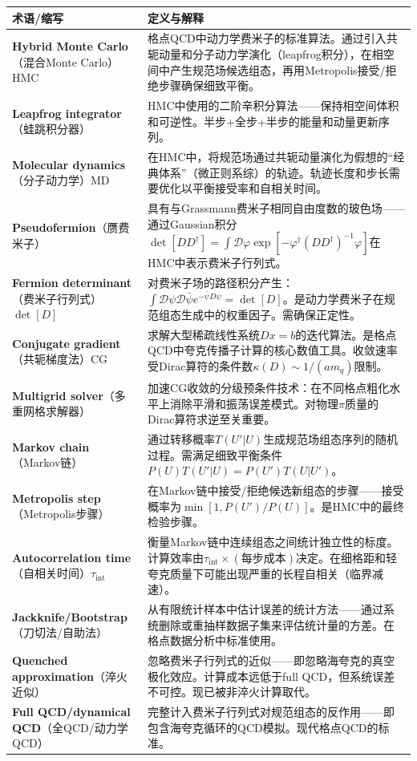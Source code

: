 \documentclass[12pt,a4paper]{ctexart}
\begin{document}
\begin{longtable}{p{3.5cm}p{9cm}}
\toprule
\textbf{术语/缩写} & \textbf{定义与解释} \\
\midrule
\endhead
\textbf{Hybrid Monte Carlo}（混合Monte Carlo）HMC& 格点QCD中动力学费米子的标准算法。通过引入共轭动量和分子动力学演化（leapfrog积分），在相空间中产生规范场候选组态，再用Metropolis接受/拒绝步骤确保细致平衡。\\
\textbf{Leapfrog integrator}（蛙跳积分器）& HMC中使用的二阶辛积分算法——保持相空间体积和可逆性。半步+全步+半步的能量和动量更新序列。\\
\textbf{Molecular dynamics}（分子动力学）MD& 在HMC中，将规范场通过共轭动量演化为假想的``经典体系''（微正则系综）的轨迹。轨迹长度和步长需要优化以平衡接受率和自相关时间。\\
\textbf{Pseudofermion}（赝费米子）& 具有与Grassmann费米子相同自由度数的玻色场——通过Gaussian积分$\det[D D^\dagger] = \int \mathcal{D}\varphi \exp[-\varphi^\dagger (D D^\dagger)^{-1}\varphi]$在HMC中表示费米子行列式。\\
\textbf{Fermion determinant}（费米子行列式）$\det[D]$& 对费米子场的路径积分产生：$\int\mathcal{D}\psi\mathcal{D}\bar\psi e^{-\bar\psi D \psi} = \det[D]$。是动力学费米子在规范组态生成中的权重因子。需确保正定性。\\
\textbf{Conjugate gradient}（共轭梯度法）CG& 求解大型稀疏线性系统$D x = b$的迭代算法。是格点QCD中夸克传播子计算的核心数值工具。收敛速率受Dirac算符的条件数$\kappa(D) \sim 1/(a m_q)$限制。\\
\textbf{Multigrid solver}（多重网格求解器）& 加速CG收敛的分级预条件技术：在不同格点粗化水平上消除平滑和振荡误差模式。对物理$\pi$质量的Dirac算符求逆至关重要。\\
\textbf{Markov chain}（Markov链）& 通过转移概率$T(U'|U)$生成规范场组态序列的随机过程。需满足细致平衡条件$P(U)T(U'|U) = P(U')T(U|U')$。\\
\textbf{Metropolis step}（Metropolis步骤）& 在Markov链中接受/拒绝候选新组态的步骤——接受概率为$\min[1, P(U')/P(U)]$。是HMC中的最终检验步骤。\\
\textbf{Autocorrelation time}（自相关时间）$\tau_{\text{int}}$& 衡量Markov链中连续组态之间统计独立性的标度。计算效率由$\tau_{\text{int}} \times (\text{每步成本})$决定。在细格距和轻夸克质量下可能出现严重的长程自相关（临界减速）。\\
\textbf{Jackknife/Bootstrap}（刀切法/自助法）& 从有限统计样本中估计误差的统计方法——通过系统删除或重抽样数据子集来评估统计量的方差。在格点数据分析中标准使用。\\
\textbf{Quenched approximation}（淬火近似）& 忽略费米子行列式的近似——即忽略海夸克的真空极化效应。计算成本远低于full QCD，但系统误差不可控。现已被非淬火计算取代。\\
\textbf{Full QCD/dynamical QCD}（全QCD/动力学QCD）& 完整计入费米子行列式对规范组态的反作用——即包含海夸克循环的QCD模拟。现代格点QCD的标准。\\
\bottomrule
\end{longtable}
\end{document}
